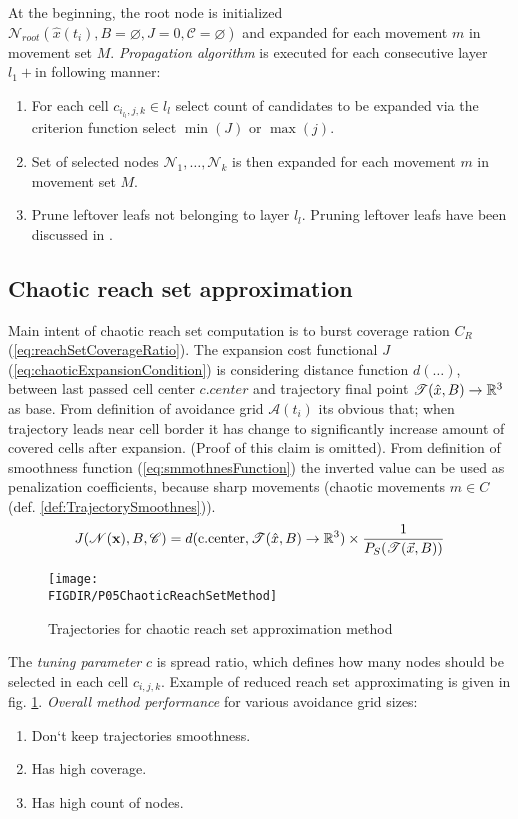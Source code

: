 \noindent At the beginning, the root node is initialized $\mathscr{N}_{root}(\hat{x}(t_i),B=\varnothing,J=0,\mathscr{C}=\varnothing)$ and expanded for each movement $m$ in movement set $M$. \emph{Propagation algorithm} is executed for each consecutive layer $l_1+$in following manner:
\begin{enumerate}
    \item For each cell $c_{i_{l_l},j,k}\in l_l$ select count of candidates to be expanded via the criterion function select $\min(J)$ or $\max(j)$. 
    \item Set of selected nodes $\mathscr{N}_1,\dots,\mathscr{N}_k$  is then expanded for each movement $m$ in movement set $M$.
    \item Prune leftover leafs not belonging to layer $l_l$. Pruning leftover leafs have been discussed in \cite{birmingham1988tree}.
\end{enumerate}


\subsection{Chaotic reach set approximation}\label{s:chaoticApproximationReachSet}
\noindent Main intent of chaotic reach set computation is to burst coverage ration $C_R$ (\ref{eq:reachSetCoverageRatio}). The expansion cost functional $J$ (\ref{eq:chaoticExpansionCondition}) is considering distance function $d(\dots)$, between last passed cell center $c.center$ and trajectory final point $\mathscr{T}(\hat{x},B)\to\mathbb{R}^3$ as base. From definition of avoidance grid $\mathscr{A}(t_i)$ its obvious that; when trajectory leads near cell border it has change to significantly increase amount of covered cells after expansion. (Proof of this claim is omitted). From definition of smoothness function (\ref{eq:smmothnesFunction}) the inverted value can be used as penalization coefficients, because sharp movements (chaotic movements $m\in C$ (def. \ref{def:TrajectorySmoothnes})).
\begin{equation}\label{eq:chaoticExpansionCondition}
    J(\mathscr{N}(\textbf{x}),B,\mathscr{C}) = d(\text{c.center},\mathscr{T}(\hat{x},B)\to\mathbb{R}^3)\times \frac{1}{P_S(\mathscr{T}(\vec{x},B))}
\end{equation}

\begin{figure}[H]
    \centering
    \texttt{[image: \\FIGDIR/P05ChaoticReachSetMethod]}
    \caption{Trajectories for chaotic reach set approximation method}
    \label{fig:P05ChaoticReachSetMethod}
\end{figure}
The \emph{tuning parameter} $c$ is spread ratio, which defines how many nodes should be selected in each cell $c_{i,j,k}$. Example of reduced reach set approximating is given in fig. \ref{fig:P05ChaoticReachSetMethod}. \emph{Overall method performance} for various avoidance grid sizes:
\begin{enumerate}
    \item Don`t keep trajectories smoothness.
    \item Has high coverage. 
    \item Has high count of nodes.
\end{enumerate}

